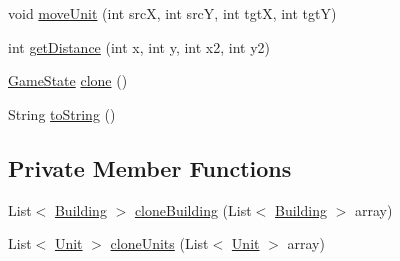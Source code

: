 \begin{DoxyCompactItemize}
\item 
void \mbox{\hyperlink{classgame_1_1game_state_1_1_game_state_aea3d3b45856b36e86e0792b2fe3fdca5}{move\+Unit}} (int srcX, int srcY, int tgtX, int tgtY)
\item 
int \mbox{\hyperlink{classgame_1_1game_state_1_1_game_state_a29fa52bbdf644f5107e5d150107801a2}{get\+Distance}} (int x, int y, int x2, int y2)
\item 
\mbox{\hyperlink{classgame_1_1game_state_1_1_game_state}{Game\+State}} \mbox{\hyperlink{classgame_1_1game_state_1_1_game_state_acb0b76d0c2eb02659818962cd2894d3a}{clone}} ()
\item 
String \mbox{\hyperlink{classgame_1_1game_state_1_1_game_state_a46d322e319cd211f4a4a90d7bf02d26c}{to\+String}} ()
\end{DoxyCompactItemize}
\subsection*{Private Member Functions}
\begin{DoxyCompactItemize}
\item 
List$<$ \mbox{\hyperlink{classgame_1_1board_1_1_building}{Building}} $>$ \mbox{\hyperlink{classgame_1_1game_state_1_1_game_state_a9acfa671516164070b06cb8f94be79fa}{clone\+Building}} (List$<$ \mbox{\hyperlink{classgame_1_1board_1_1_building}{Building}} $>$ array)
\item 
List$<$ \mbox{\hyperlink{classgame_1_1board_1_1_unit}{Unit}} $>$ \mbox{\hyperlink{classgame_1_1game_state_1_1_game_state_ae1661eac863f6e53722801714ad31103}{clone\+Units}} (List$<$ \mbox{\hyperlink{classgame_1_1board_1_1_unit}{Unit}} $>$ array)
\end{DoxyCompactItemize}
